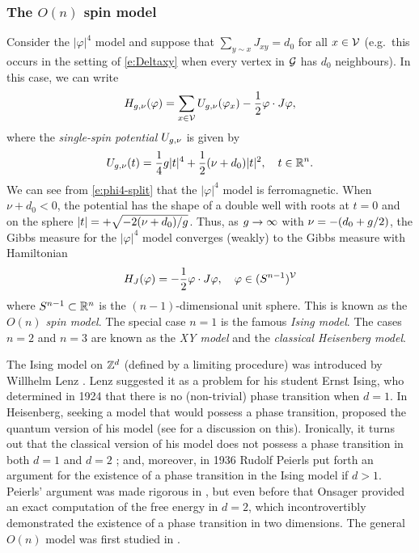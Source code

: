 \subsubsection{The $O(n)$ spin model}

Consider the $|\varphi|^4$ model and suppose that $\sum_{y\sim x} J_{xy} = d_0$
for all $x\in\mathcal{V}$ (e.g.\ this occurs in the setting of \eqref{e:Deltaxy} when every
vertex in $\mathcal{G}$ has $d_0$ neighbours).
In this case, we can write
\begin{equation}
\label{e:phi4-split}
H_{g,\nu}(\varphi)
  =
\sum_{x\in\mathcal{V}} U_{g,\nu}(\varphi_x) - \frac{1}{2} \varphi \cdot J \varphi,
\end{equation}
where the \emph{single-spin potential} $U_{g,\nu}$ is given by
\begin{equation}
U_{g,\nu}(t)
	=
\frac{1}{4} g |t|^4
	+
\frac{1}{2} (\nu + d_0) |t|^2,
	\quad
t \in {\mathbb R}^n.
\end{equation}
We can see from \eqref{e:phi4-split} that the $|\varphi|^4$ model is ferromagnetic.
When $\nu + d_0 < 0$, the potential has the shape of a double well with roots at
$t = 0$ and on the sphere $|t| = +\sqrt{-2 (\nu + d_0) / g}$.
Thus, as $g\rightarrow\infty$ with $\nu = -(d_0 + g/2)$, the Gibbs measure for the
$|\varphi|^4$ model converges (weakly) to the Gibbs measure with Hamiltonian
\begin{equation}
\label{e:on-model}
H_J(\varphi) = -\frac12 \varphi \cdot J \varphi,
	\quad
\varphi \in (S^{n-1})^{\mathcal{V}}
\end{equation}
where $S^{n-1} \subset {\mathbb R}^n$ is the $(n-1)$-dimensional unit sphere.
This is known as the \emph{$O(n)$ spin model}. The special case $n = 1$ is the
famous \emph{Ising model}. The cases $n = 2$ and $n = 3$ are known as the
\emph{XY model} and the \emph{classical Heisenberg model}.

\begin{rk}
The Ising model on ${ {{\mathbb Z}}^d }$ (defined by a limiting procedure) was introduced
by Willhelm Lenz \cite{Lenz20}. Lenz
suggested it as a problem for his student Ernst Ising, who determined in 1924
\cite{Ising25} that there is no (non-trivial) phase transition when $d = 1$.
In \cite{Heisenberg28} Heisenberg, seeking a model that would possess a phase
transition, proposed the quantum version of his model (see \cite{Brush67} for
a discussion on this). Ironically, it turns out that the classical version of
his model does not possess a phase transition in both $d = 1$ and $d = 2$ \cite{MW66};
and, moreover, in 1936 Rudolf Peierls \cite{Peierls36} put forth an argument for the
existence of a phase transition in the Ising model if $d > 1$. Peierls' argument
was made rigorous in \cite{Griffiths64}, but even before that Onsager \cite{Onsager44}
provided an exact computation of the free energy in $d = 2$, which incontrovertibly
demonstrated the existence of a phase transition in two dimensions. The general
$O(n)$ model was first studied in \cite{Stanley68}.
\end{rk}

